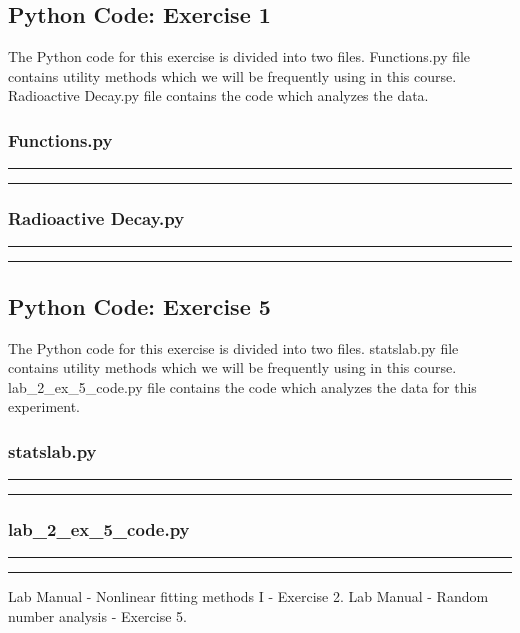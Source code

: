 \documentclass[letterpaper,12pt]{article}
\begin{document}
\pagebreak

\subsection{Python Code: Exercise 1}

The Python code for this exercise is divided into two files. Functions.py file contains utility methods
which we will be frequently using in this course. Radioactive Decay.py file contains the code which analyzes
the data.

\subsubsection{Functions.py}
\noindent\rule{\textwidth}{1pt}

\noindent\rule{\textwidth}{1pt}

\pagebreak

\subsubsection{Radioactive Decay.py}
\noindent\rule{\textwidth}{1pt}

\noindent\rule{\textwidth}{1pt}

\pagebreak

\subsection{Python Code: Exercise 5}

The Python code for this exercise is divided into two files. statslab.py file 
contains utility methods
which we will be frequently using in this course. lab\_2\_ex\_5\_code.py file contains 
the code which analyzes
the data for this experiment.

\subsubsection{statslab.py}

\noindent\rule{\textwidth}{1pt}

\noindent\rule{\textwidth}{1pt}

\pagebreak

\subsubsection{lab\_2\_ex\_5\_code.py}
\noindent\rule{\textwidth}{1pt}

\noindent\rule{\textwidth}{1pt}
\pagebreak

\begin{thebibliography}{99}

 Lab Manual - Nonlinear fitting methods I - Exercise 2.
 Lab Manual - Random number analysis - Exercise 5.

\end{thebibliography}
\end{document}

